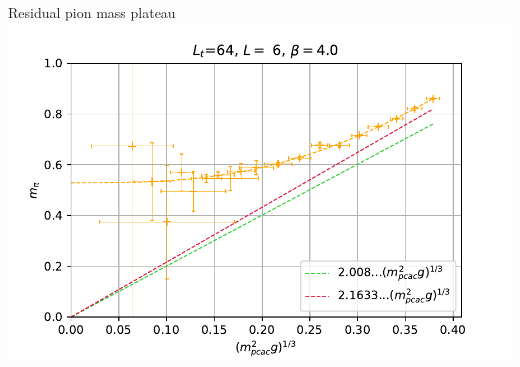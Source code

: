 \documentclass[english]{beamer}
\begin{document}
\begin{frame}{Residual pion mass plateau}
  \includegraphics[width=1\textwidth]{figs/Mpi6x64Pt10}
\end{frame}
\end{document}
